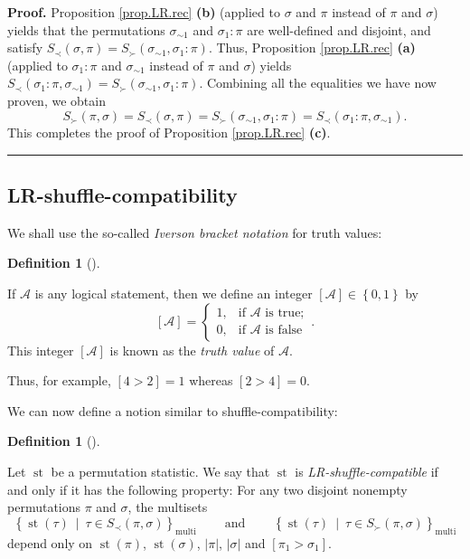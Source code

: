 \documentclass[numbers=enddot,12pt,final,onecolumn,notitlepage]{scrartcl}%
\theoremstyle{definition}
\newtheorem{defi}[theo]{Definition}
\newenvironment{definition}[1][]
{\begin{defi}[#1]\begin{leftbar}}
{\end{leftbar}\end{defi}}
\newenvironment{proof}[1][Proof]{\noindent\textbf{#1.} }{\ \rule{0.5em}{0.5em}}
\newenvironment{verlong}{}{}
\begin{document}
\begin{verlong}
\begin{proof}
Proposition \ref{prop.LR.rec} \textbf{(b)} (applied to $\sigma$ and $\pi$
instead of $\pi$ and $\sigma$) yields that the permutations $\sigma_{\sim1}$
and $\sigma_{1}:\pi$ are well-defined and disjoint, and satisfy $S_{\prec
}\left(  \sigma,\pi\right)  =S_{\succ}\left(  \sigma_{\sim1},\sigma_{1}%
:\pi\right)  $. Thus, Proposition \ref{prop.LR.rec} \textbf{(a)} (applied to
$\sigma_{1}:\pi$ and $\sigma_{\sim1}$ instead of $\pi$ and $\sigma$) yields
$S_{\prec}\left(  \sigma_{1}:\pi,\sigma_{\sim1}\right)  =S_{\succ}\left(
\sigma_{\sim1},\sigma_{1}:\pi\right)  $. Combining all the equalities we have
now proven, we obtain%
\[
S_{\succ}\left(  \pi,\sigma\right)  =S_{\prec}\left(  \sigma,\pi\right)
=S_{\succ}\left(  \sigma_{\sim1},\sigma_{1}:\pi\right)  =S_{\prec}\left(
\sigma_{1}:\pi,\sigma_{\sim1}\right)  .
\]
This completes the proof of Proposition \ref{prop.LR.rec} \textbf{(c)}.
\end{proof}
\end{verlong}

\subsection{LR-shuffle-compatibility}

We shall use the so-called \textit{Iverson bracket notation} for truth values:

\begin{definition}
\label{def.iverson}If $\mathcal{A}$ is any logical statement, then we define
an integer $\left[  \mathcal{A}\right]  \in\left\{  0,1\right\}  $ by%
\[
\left[  \mathcal{A}\right]  =%
\begin{cases}
1, & \text{if }\mathcal{A}\text{ is true};\\
0, & \text{if }\mathcal{A}\text{ is false}%
\end{cases}
.
\]
This integer $\left[  \mathcal{A}\right]  $ is known as the \textit{truth
value} of $\mathcal{A}$.
\end{definition}

Thus, for example, $\left[  4>2\right]  =1$ whereas $\left[  2>4\right]  =0$.

We can now define a notion similar to shuffle-compatibility:

\begin{definition}
\label{def.LRcomp}Let $\operatorname*{st}$ be a permutation statistic. We say
that $\operatorname*{st}$ is \textit{LR-shuffle-compatible} if and only if it
has the following property: For any two disjoint nonempty permutations $\pi$
and $\sigma$, the multisets%
\[
\left\{  \operatorname*{st}\left(  \tau\right)  \ \mid\ \tau\in S_{\prec
}\left(  \pi,\sigma\right)  \right\}  _{\operatorname*{multi}}
\ \ \ \ \ \ \ \ \ \ \text{and}\ \ \ \ \ \ \ \ \ \ \left\{  \operatorname*{st}%
\left(  \tau\right)  \ \mid\ \tau\in S_{\succ}\left(  \pi,\sigma\right)
\right\}  _{\operatorname*{multi}}
\]
depend only on $\operatorname*{st}\left(  \pi\right)  $, $\operatorname*{st}%
\left(  \sigma\right)  $, $\left\vert \pi\right\vert $, $\left\vert
\sigma\right\vert $ and $\left[  \pi_{1}>\sigma_{1}\right]  $.
\end{definition}
\end{document}

